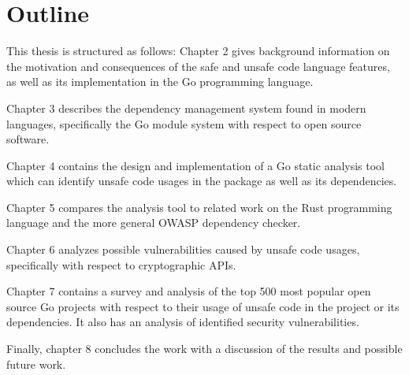 
\section{Outline}\label{sec:outline}

This thesis is structured as follows: Chapter 2 gives background information on the motivation
and consequences of the safe and unsafe code language features, as well as its implementation
in the Go programming language.

Chapter 3 describes the dependency management system found in modern languages, specifically
the Go module system with respect to open source software.

Chapter 4 contains the design and implementation of a Go static analysis tool which can identify
unsafe code usages in the package as well as its dependencies.

Chapter 5 compares the analysis tool to related work on the Rust programming language and the
more general OWASP dependency checker.

Chapter 6 analyzes possible vulnerabilities caused by unsafe code usages, specifically with
respect to cryptographic APIs.

Chapter 7 contains a survey and analysis of the top 500 most popular open source Go projects
with respect to their usage of unsafe code in the project or its dependencies. It also has an
analysis of identified security vulnerabilities.

Finally, chapter 8 concludes the work with a discussion of the results and possible future work.


